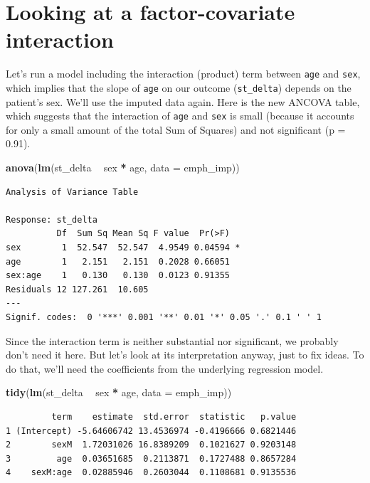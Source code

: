 \documentclass[]{book}
\newenvironment{Shaded}{\begin{snugshade}}{\end{snugshade}}
\newcommand{\KeywordTok}[1]{\textcolor[rgb]{0.13,0.29,0.53}{\textbf{#1}}}
\newcommand{\DataTypeTok}[1]{\textcolor[rgb]{0.13,0.29,0.53}{#1}}
\newcommand{\StringTok}[1]{\textcolor[rgb]{0.31,0.60,0.02}{#1}}
\newcommand{\OperatorTok}[1]{\textcolor[rgb]{0.81,0.36,0.00}{\textbf{#1}}}
\newcommand{\NormalTok}[1]{#1}
\theoremstyle{definition}
\theoremstyle{definition}
\theoremstyle{definition}
\theoremstyle{remark}
\begin{document}
\section{Looking at a factor-covariate
interaction}\label{looking-at-a-factor-covariate-interaction}

Let's run a model including the interaction (product) term between
\texttt{age} and \texttt{sex}, which implies that the slope of
\texttt{age} on our outcome (\texttt{st\_delta}) depends on the
patient's sex. We'll use the imputed data again. Here is the new ANCOVA
table, which suggests that the interaction of \texttt{age} and
\texttt{sex} is small (because it accounts for only a small amount of
the total Sum of Squares) and not significant (p = 0.91).

\begin{Shaded}
\begin{Highlighting}[]
\KeywordTok{anova}\NormalTok{(}\KeywordTok{lm}\NormalTok{(st_delta }\OperatorTok{~}\StringTok{ }\NormalTok{sex }\OperatorTok{*}\StringTok{ }\NormalTok{age, }\DataTypeTok{data =}\NormalTok{ emph_imp))}
\end{Highlighting}
\end{Shaded}

\begin{verbatim}
Analysis of Variance Table

Response: st_delta
          Df  Sum Sq Mean Sq F value  Pr(>F)  
sex        1  52.547  52.547  4.9549 0.04594 *
age        1   2.151   2.151  0.2028 0.66051  
sex:age    1   0.130   0.130  0.0123 0.91355  
Residuals 12 127.261  10.605                  
---
Signif. codes:  0 '***' 0.001 '**' 0.01 '*' 0.05 '.' 0.1 ' ' 1
\end{verbatim}

Since the interaction term is neither substantial nor significant, we
probably don't need it here. But let's look at its interpretation
anyway, just to fix ideas. To do that, we'll need the coefficients from
the underlying regression model.

\begin{Shaded}
\begin{Highlighting}[]
\KeywordTok{tidy}\NormalTok{(}\KeywordTok{lm}\NormalTok{(st_delta }\OperatorTok{~}\StringTok{ }\NormalTok{sex }\OperatorTok{*}\StringTok{ }\NormalTok{age, }\DataTypeTok{data =}\NormalTok{ emph_imp))}
\end{Highlighting}
\end{Shaded}

\begin{verbatim}
         term    estimate  std.error  statistic   p.value
1 (Intercept) -5.64606742 13.4536974 -0.4196666 0.6821446
2        sexM  1.72031026 16.8389209  0.1021627 0.9203148
3         age  0.03651685  0.2113871  0.1727488 0.8657284
4    sexM:age  0.02885946  0.2603044  0.1108681 0.9135536
\end{verbatim}
\end{document}
